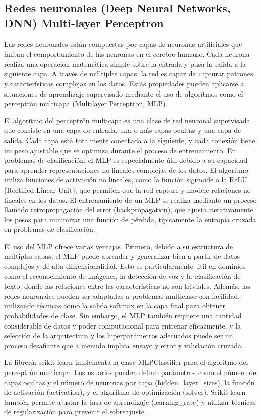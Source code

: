 \subsection{Redes neuronales (Deep Neural Networks, DNN) Multi-layer Perceptron}

Las redes neuronales están compuestas por capas de neuronas artificiales que imitan el comportamiento de las neuronas en el cerebro humano. Cada neurona realiza una operación matemática simple sobre la entrada y pasa la salida a la siguiente capa. A través de múltiples capas, la red es capaz de capturar patrones y características complejas en los datos. Estás propiedades pueden aplicarse a situaciones de aprendizaje supervisado mediante el uso de algoritmos como el perceptrón multicapa (Multilayer Perceptron, MLP).

El algoritmo del perceptrón multicapa es una clase de red neuronal supervisada que consiste en una capa de entrada, una o más capas ocultas y una capa de salida. Cada capa está totalmente conectada a la siguiente, y cada conexión tiene un peso ajustable que se optimiza durante el proceso de entrenamiento. En problemas de clasificación, el MLP es especialmente útil debido a su capacidad para aprender representaciones no lineales complejas de los datos. El algoritmo utiliza funciones de activación no lineales, como la función sigmoide o la ReLU (Rectified Linear Unit), que permiten que la red capture y modele relaciones no lineales en los datos. El entrenamiento de un MLP se realiza mediante un proceso llamado retropropagación del error (backpropagation), que ajusta iterativamente los pesos para minimizar una función de pérdida, típicamente la entropía cruzada en problemas de clasificación.

El uso del MLP ofrece varias ventajas. Primero, debido a su estructura de múltiples capas, el MLP puede aprender y generalizar bien a partir de datos complejos y de alta dimensionalidad. Esto es particularmente útil en dominios como el reconocimiento de imágenes, la detección de voz y la clasificación de texto, donde las relaciones entre las características no son triviales. Además, las redes neuronales pueden ser adaptadas a problemas multiclase con facilidad, utilizando técnicas como la salida softmax en la capa final para obtener probabilidades de clase. Sin embargo, el MLP también requiere una cantidad considerable de datos y poder computacional para entrenar eficazmente, y la selección de la arquitectura y los hiperparámetros adecuados puede ser un proceso desafiante que a menudo implica ensayo y error y validación cruzada.

La librería scikit-learn implementa la clase MLPClassifier \cite{sk-multilayer-perceptron} para el algoritmo del perceptrón multicapa. Los usuarios pueden definir parámetros como el número de capas ocultas y el número de neuronas por capa (hidden\_layer\_sizes), la función de activación (activation), y el algoritmo de optimización (solver). Scikit-learn también permite ajustar la tasa de aprendizaje (learning\_rate) y utilizar técnicas de regularización para prevenir el sobreajuste.
